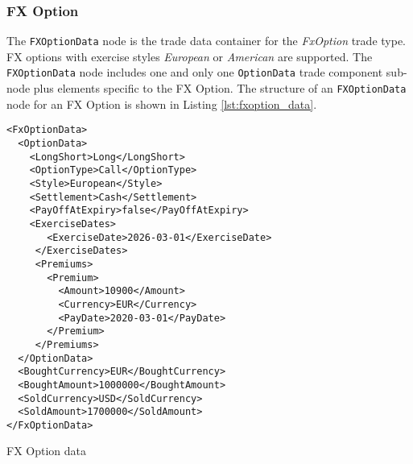 \subsubsection{FX Option}

\ifdefined{}\fi

The \lstinline!FXOptionData! node is the trade data container for the \emph{FxOption} trade type. FX options with exercise styles \emph{European} or \emph{American} are supported. 
The \lstinline!FXOptionData! node includes one and only one \lstinline!OptionData! trade
component sub-node plus elements specific to the FX Option. The structure of an \lstinline!FXOptionData! node
for an FX Option is shown in Listing \ref{lst:fxoption_data}.

\begin{listing}[H]
\begin{verbatim}
<FxOptionData>
  <OptionData>
    <LongShort>Long</LongShort>
    <OptionType>Call</OptionType>
    <Style>European</Style>
    <Settlement>Cash</Settlement>
    <PayOffAtExpiry>false</PayOffAtExpiry>
    <ExerciseDates>
       <ExerciseDate>2026-03-01</ExerciseDate>
     </ExerciseDates>
     <Premiums>
       <Premium>
         <Amount>10900</Amount>
         <Currency>EUR</Currency>
         <PayDate>2020-03-01</PayDate>
       </Premium>
     </Premiums>
  </OptionData>
  <BoughtCurrency>EUR</BoughtCurrency>
  <BoughtAmount>1000000</BoughtAmount>
  <SoldCurrency>USD</SoldCurrency>
  <SoldAmount>1700000</SoldAmount>
</FxOptionData>
\end{verbatim}
\caption{FX Option data}
\label{lst:fxoption_data}
\end{listing}

